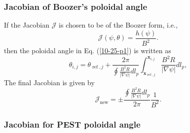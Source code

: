 \documentclass{article}
\newcommand{\tmop}[1]{\ensuremath{\operatorname{#1}}}
\begin{document}
\subsubsection{Jacobian of Boozer's poloidal angle}

If the Jacobian $\mathcal{J}$ is chosen to be of the Boozer form, i.e.,
\begin{equation}
  \mathcal{J} (\psi, \theta) = \frac{h (\psi)}{B^2} .
\end{equation}
then the poloidal angle in Eq. (\ref{10-25-p1}) is written as
\begin{equation}
  \theta_{i, j} = \theta_{\tmop{ref}, j} + \frac{2 \pi}{\oint \frac{B^2 R}{|
  \nabla \psi |} d l_p} \int_{\mathbf{x}_{\tmop{ref}, j}}^{\mathbf{x}_{i, j}}
  \frac{B^2 R}{| \nabla \psi |} d l_p,
\end{equation}
The final Jacobian is given by
\begin{equation}
  \mathcal{J}_{\tmop{new}} = \pm \frac{\oint \frac{B^2 R}{| \nabla \psi |} d
  l_p}{2 \pi}  \frac{1}{B^2} .
\end{equation}


\subsubsection{Jacobian for PEST poloidal angle}\label{17-10-30-1}
\end{document}
